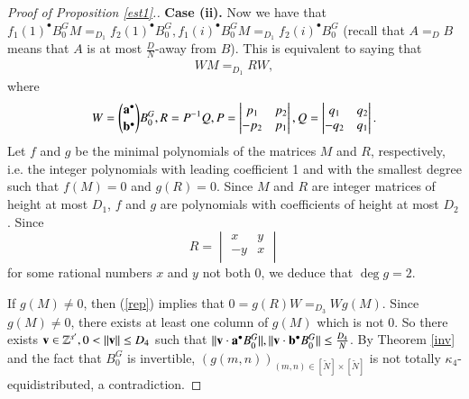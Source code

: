 \documentclass[12pt,amstex]{amsart}
\theoremstyle{definition}
\def \D {\kappa}
\def \a {\bold{a}}
\def \b {\bold{b}}
\begin{document}
\begin{proof}[Proof of Proposition \ref{est1}.]
\textbf{Case (ii).} Now we have that $f_{1}(1)^{\bullet}B_{0}^{G}M=_{D_{1}}f_{2}(1)^{\bullet}B_{0}^{G},f_{1}(i)^{\bullet}B_{0}^{G}M=_{D_{1}}f_{2}(i)^{\bullet}B_{0}^{G}$ (recall that $A=_{D}B$ means that $A$ is at most $\frac{D}{N}$-away from $B$). This is equivalent to saying that
\begin{equation}\label{rep}
\begin{split}
  WM=_{D_{1}}RW,
\end{split}
\end{equation}
where
\begin{equation}\nonumber
W=\binom{\a^{\bullet}}{\b^{\bullet}}B_{0}^{G}, R=P^{-1}Q,
P=\begin{vmatrix}

p_{1} &  p_{2}\\

-p_{2} & p_{1}\\
\end{vmatrix},
Q=\begin{vmatrix}

q_{1} &  q_{2}\\

-q_{2} & q_{1}\\
\end{vmatrix}.
\end{equation}
Let $f$ and $g$ be the minimal polynomials of the matrices $M$ and $R$, respectively, i.e.
the integer polynomials with leading coefficient 1 and with the smallest
degree such that $f(M)=0$ and $g(R)=0$. Since $M$ and $R$ are integer matrices of height at most $D_{1}$, $f$ and $g$ are polynomials
with coefficients of height at most $D_{2}$. Since
\begin{equation}\nonumber
R=\begin{vmatrix}

x &  y\\

-y & x\\
\end{vmatrix}
\end{equation}
for some rational numbers $x$ and $y$ not both 0, we deduce that $\deg g=2$.

If $g(M)\neq 0$, then (\ref{rep}) implies that $0=g(R)W=_{D_{3}}Wg(M)$. Since $g(M)\neq 0$, there exists at least one column of $g(M)$ which is not 0.
So there exists
$\bold{v}\in\mathbb{Z}^{s'},0<\Vert\bold{v}\Vert\leq D_{4}$ such that $\Vert\bold{v}\cdot\a^{\bullet} B_{0}^{G}\Vert,\Vert\bold{v}\cdot\b^{\bullet} B_{0}^{G}\Vert\leq\frac{D_{4}}{N}$. By Theorem \ref{inv} and the fact that $B_{0}^{G}$ is invertible, $(g(m,n))_{(m,n)\in[\tilde{N}]\times[\tilde{N}]}$ is not totally $\D_{4}$-equidistributed, a contradiction.


\end{proof}
\end{document}
